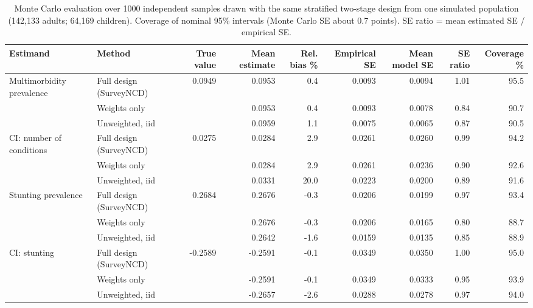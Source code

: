 \begin{table}[htbp]

\caption{\label{tab:tab_simulation}Monte Carlo evaluation over 1000 independent samples drawn with the same stratified two-stage design from one simulated population (142,133 adults; 64,169 children). Coverage of nominal 95\% intervals (Monte Carlo SE about 0.7 points). SE ratio = mean estimated SE / empirical SE.}
\centering
\scriptsize\setlength{\tabcolsep}{3pt}
\begin{adjustbox}{max width=\linewidth}
\begin{tabular}{llrrrrrrr}
\toprule
Estimand & Method & True value & Mean estimate & Rel. bias \% & Empirical SE & Mean model SE & SE ratio & Coverage \%\\
\midrule
Multimorbidity prevalence & Full design (SurveyNCD) & 0.0949 & 0.0953 & 0.4 & 0.0093 & 0.0094 & 1.01 & 95.5\\
 & Weights only &  & 0.0953 & 0.4 & 0.0093 & 0.0078 & 0.84 & 90.7\\
 & Unweighted, iid &  & 0.0959 & 1.1 & 0.0075 & 0.0065 & 0.87 & 90.5\\
CI: number of conditions & Full design (SurveyNCD) & 0.0275 & 0.0284 & 2.9 & 0.0261 & 0.0260 & 0.99 & 94.2\\
 & Weights only &  & 0.0284 & 2.9 & 0.0261 & 0.0236 & 0.90 & 92.6\\
 & Unweighted, iid &  & 0.0331 & 20.0 & 0.0223 & 0.0200 & 0.89 & 91.6\\
Stunting prevalence & Full design (SurveyNCD) & 0.2684 & 0.2676 & -0.3 & 0.0206 & 0.0199 & 0.97 & 93.4\\
 & Weights only &  & 0.2676 & -0.3 & 0.0206 & 0.0165 & 0.80 & 88.7\\
 & Unweighted, iid &  & 0.2642 & -1.6 & 0.0159 & 0.0135 & 0.85 & 88.9\\
CI: stunting & Full design (SurveyNCD) & -0.2589 & -0.2591 & -0.1 & 0.0349 & 0.0350 & 1.00 & 95.0\\
 & Weights only &  & -0.2591 & -0.1 & 0.0349 & 0.0333 & 0.95 & 93.9\\
 & Unweighted, iid &  & -0.2657 & -2.6 & 0.0288 & 0.0278 & 0.97 & 94.0\\
\bottomrule
\end{tabular}
\end{adjustbox}
\end{table}
